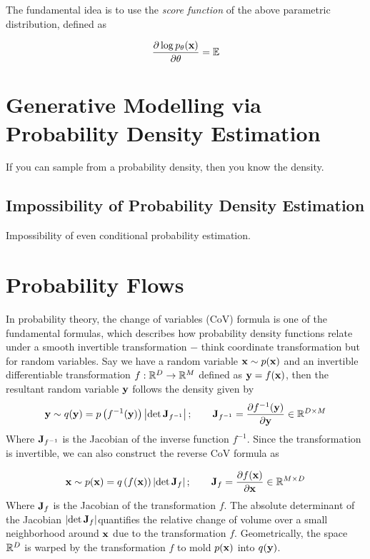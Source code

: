 \documentclass[a4paper, 11pt]{article}
\begin{document}
The fundamental idea is to use the \emph{score function} of the above parametric distribution, defined as 

\begin{align}
    \frac{\partial \log p_\theta(\mbox{$\mbox{$\mathbf{x}$}$})}{\partial \theta} = \mathbb{E} 
\end{align}


\section{Generative Modelling via Probability Density Estimation}

If you can sample from a probability density, then you know the density.

\subsection{Impossibility of Probability Density Estimation}
Impossibility of even conditional probability estimation.

\section{Probability Flows}
In probability theory, the change of variables (CoV) formula is one of the fundamental formulas, which describes how probability density functions relate under a smooth invertible transformation $-$ think coordinate transformation but for random variables. Say we have a random variable $\mbox{$\mbox{$\mathbf{x}$}$} \sim p(\mbox{$\mbox{$\mathbf{x}$}$})$ and an invertible differentiable transformation $f: \mathbb{R}^D \to \mathbb{R}^M$ defined as $\mbox{$\mbox{$\mathbf{y}$}$} = f(\mbox{$\mbox{$\mathbf{x}$}$})$, then the resultant random variable $\mbox{$\mbox{$\mathbf{y}$}$}$ follows the density given by
\begin{align}
    \mbox{$\mbox{$\mathbf{y}$}$} \sim q(\mbox{$\mbox{$\mathbf{y}$}$}) = p\left(f^{-1}(\mbox{$\mbox{$\mathbf{y}$}$}) \right)\left |\det \mbox{$\mbox{$\mathbf{J}$}$}_{f^{-1}} \right|; \qquad \mbox{$\mbox{$\mathbf{J}$}$}_{f^{-1}} = \frac{\partial f^{-1}(\mbox{$\mbox{$\mathbf{y}$}$})}{\partial \mbox{$\mbox{$\mathbf{y}$}$}} \in \mathbb{R}^{D \times M}
\end{align}
Where $\mbox{$\mbox{$\mathbf{J}$}$}_{f^{-1}}$ is the Jacobian of the inverse function $f^{-1}$. Since the transformation is invertible, we can also construct the reverse CoV formula as

\begin{align}
    \mbox{$\mbox{$\mathbf{x}$}$} \sim p(\mbox{$\mbox{$\mathbf{x}$}$}) = q\left(f(\mbox{$\mbox{$\mathbf{x}$}$}) \right)\left |\det \mbox{$\mbox{$\mathbf{J}$}$}_{f} \right|; \qquad \mbox{$\mbox{$\mathbf{J}$}$}_{f} = \frac{\partial f(\mbox{$\mbox{$\mathbf{x}$}$})}{\partial \mbox{$\mbox{$\mathbf{x}$}$}} \in \mathbb{R}^{M \times D}
\end{align}
Where $\mbox{$\mbox{$\mathbf{J}$}$}_{f}$ is the Jacobian of the transformation $f$. The absolute determinant of the Jacobian $\left |\det \mbox{$\mbox{$\mathbf{J}$}$}_{f} \right|$quantifies the relative change of volume over a small neighborhood around $\mbox{$\mbox{$\mathbf{x}$}$}$ due to the transformation $f$. Geometrically, the space $\mathbb{R}^D$ is warped by the transformation $f$ to mold $p(\mbox{$\mbox{$\mathbf{x}$}$})$ into $q(\mbox{$\mbox{$\mathbf{y}$}$})$.
\end{document}
